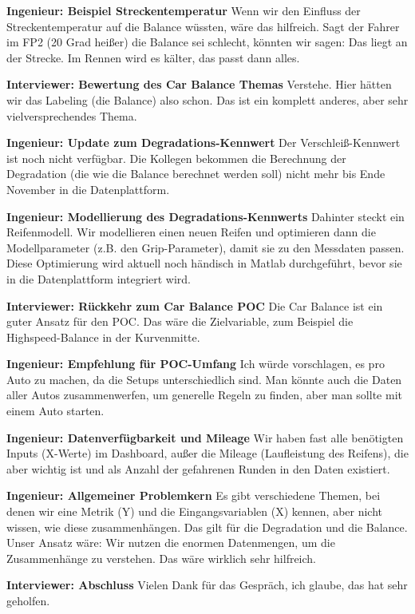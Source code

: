 \textbf{Ingenieur: Beispiel Streckentemperatur}
Wenn wir den Einfluss der Streckentemperatur auf die Balance wüssten, wäre das hilfreich. Sagt der Fahrer im FP2 (20 Grad heißer) die Balance sei schlecht, könnten wir sagen: Das liegt an der Strecke. Im Rennen wird es kälter, das passt dann alles.

\textbf{Interviewer: Bewertung des Car Balance Themas}
Verstehe. Hier hätten wir das Labeling (die Balance) also schon. Das ist ein komplett anderes, aber sehr vielversprechendes Thema.

\textbf{Ingenieur: Update zum Degradations-Kennwert}
Der Verschleiß-Kennwert ist noch nicht verfügbar. Die Kollegen bekommen die Berechnung der Degradation (die wie die Balance berechnet werden soll) nicht mehr bis Ende November in die Datenplattform.

\textbf{Ingenieur: Modellierung des Degradations-Kennwerts}
Dahinter steckt ein Reifenmodell. Wir modellieren einen neuen Reifen und optimieren dann die Modellparameter (z.B. den Grip-Parameter), damit sie zu den Messdaten passen. Diese Optimierung wird aktuell noch händisch in Matlab durchgeführt, bevor sie in die Datenplattform integriert wird.

\textbf{Interviewer: Rückkehr zum Car Balance POC}
Die Car Balance ist ein guter Ansatz für den POC. Das wäre die Zielvariable, zum Beispiel die Highspeed-Balance in der Kurvenmitte.

\textbf{Ingenieur: Empfehlung für POC-Umfang}
Ich würde vorschlagen, es pro Auto zu machen, da die Setups unterschiedlich sind. Man könnte auch die Daten aller Autos zusammenwerfen, um generelle Regeln zu finden, aber man sollte mit einem Auto starten.

\textbf{Ingenieur: Datenverfügbarkeit und Mileage}
Wir haben fast alle benötigten Inputs (X-Werte) im Dashboard, außer die Mileage (Laufleistung des Reifens), die aber wichtig ist und als Anzahl der gefahrenen Runden in den Daten existiert.

\textbf{Ingenieur: Allgemeiner Problemkern}
Es gibt verschiedene Themen, bei denen wir eine Metrik (Y) und die Eingangsvariablen (X) kennen, aber nicht wissen, wie diese zusammenhängen. Das gilt für die Degradation und die Balance. Unser Ansatz wäre: Wir nutzen die enormen Datenmengen, um die Zusammenhänge zu verstehen. Das wäre wirklich sehr hilfreich.

\textbf{Interviewer: Abschluss}
Vielen Dank für das Gespräch, ich glaube, das hat sehr geholfen.

\pagebreak
\nolinenumbers

